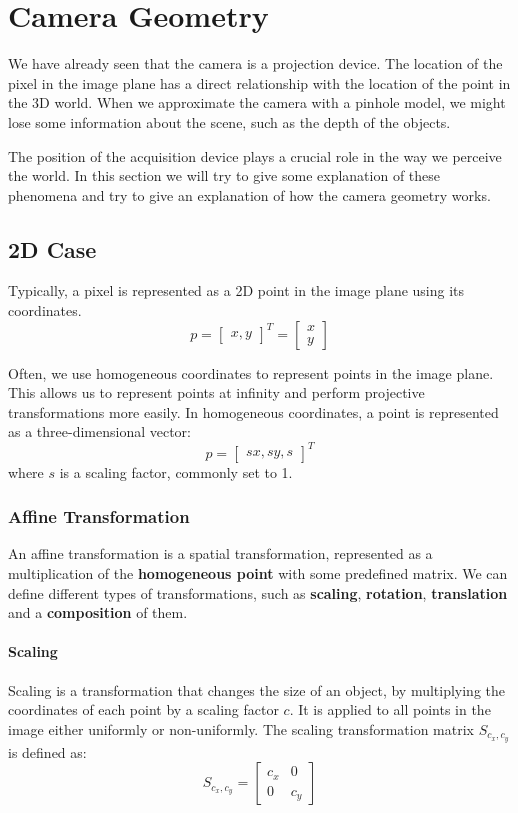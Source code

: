 \section{Camera Geometry}
We have already seen that the camera is a projection device. The location of the pixel in the image plane has a direct relationship
with the location of the point in the 3D world. When we approximate the camera with a pinhole model, we might lose some information about the scene,
such as the depth of the objects.

The position of the acquisition device plays a crucial role in the way we perceive the world. In this section we will try to give some
explanation of these phenomena and try to give an explanation of how the camera geometry works.

\subsection{2D Case}
Typically, a pixel is represented as a 2D point in the image plane using its coordinates.
\[ p = \begin{bmatrix} x, y \end{bmatrix}^T  = \begin{bmatrix} x \\ y \end{bmatrix} \]

Often, we use homogeneous coordinates to represent points in the image plane. This allows us to represent points at infinity and perform projective transformations more easily. In homogeneous coordinates, a point is represented as a three-dimensional vector:
\[ p = \begin{bmatrix} sx, sy, s \end{bmatrix}^T \]
where \( s \) is a scaling factor, commonly set to 1.

\subsubsection{Affine Transformation}
An affine transformation is a spatial transformation, represented as a multiplication of the \textbf{homogeneous point} with some predefined matrix.
We can define different types of transformations, such as \textbf{scaling}, \textbf{rotation}, \textbf{translation} and a \textbf{composition} of them.

\paragraph{Scaling}
Scaling is a transformation that changes the size of an object, by multiplying the coordinates of each point by a scaling factor $c$. It is applied to all points in the image either uniformly or non-uniformly.
The scaling transformation matrix $S_{c_x, c_y}$ is defined as:
\[ S_{c_x, c_y} = \begin{bmatrix} c_x & 0 \\ 0 & c_y \end{bmatrix} \]

